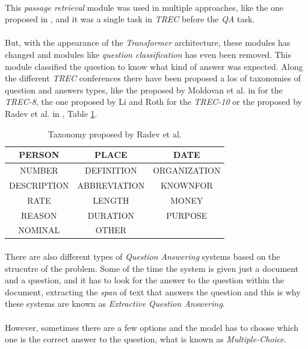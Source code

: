 \paragraph{}
This \emph{passage retrieval} module was used in multiple approaches, like the one proposed in \cite{Pablo-Sanchez}, and it was a single task in \emph{TREC} before the \emph{QA} task. 
\paragraph{}
But, with the appearance of the \emph{Transformer} architecture, these modules has changed and modules like \emph{question classification} has even been removed. This module classified the question to know what kind of answer was expected. Along the different \emph{TREC} conferences there have been proposed a los of taxonomies of question and answers types, like the proposed by Moldovan et al. in \cite{Moldovan2001} for the \emph{TREC-8}, the one proposed by Li and Roth for the \emph{TREC-10}\cite{Li2002} or the proposed by Radev et al. in \cite{Radev2005}, Table \ref{tab:radev}.
\begin{table}
	\centering
	\begin{tabular}{|c|c|c|}
		\hline 
		PERSON & PLACE & DATE \\ 
		\hline 
		NUMBER & DEFINITION & ORGANIZATION \\ 
		\hline 
		DESCRIPTION & ABBREVIATION & KNOWNFOR \\ 
		\hline 
		RATE & LENGTH & MONEY \\ 
		\hline 
		REASON & DURATION & PURPOSE \\ 
		\hline 
		NOMINAL & OTHER &  \\ 
		\hline 
	\end{tabular} 
	\caption{Taxonomy proposed by Radev et al.}
	\label{tab:radev}
\end{table}
\paragraph{}
There are also different types of \emph{Question Answering} systems based on the strucutre of the problem. Some of the time the system is given just a document and a question, and it has to look for the answer to the question within the document, extracting the \emph{span} of text that answers the question and this is why these systems are known as \emph{Extractive Question Answering}. 
\paragraph{}
However, sometimes there are a few options and the model has to choose which one is the correct answer to the question, what is known as \emph{Multiple-Choice}.
